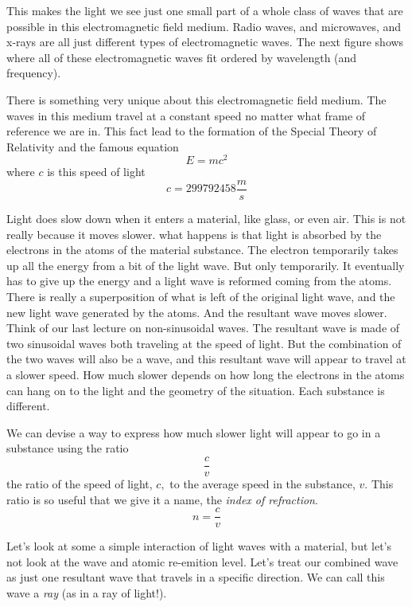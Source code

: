 \documentclass{article}
\begin{document}
This makes the light we see just one small part of a whole class of waves
that are possible in this electromagnetic field medium. Radio waves, and
microwaves, and x-rays are all just different types of electromagnetic
waves. The next figure shows where all of these electromagnetic waves fit
ordered by wavelength (and frequency).

There is something very unique about this electromagnetic field medium. The
waves in this medium travel at a constant speed no matter what frame of
reference we are in. This fact lead to the formation of the Special Theory
of Relativity and the famous equation 
\[
E=mc^{2}
\]%
where $c$ is this speed of light%
\[
c=299792458\frac{\unit{m}}{\unit{s}}
\]

Light does slow down when it enters a material, like glass, or even air.
This is not really because it moves slower. what happens is that light is
absorbed by the electrons in the atoms of the material substance. The
electron temporarily takes up all the energy from a bit of the light wave.
But only temporarily. It eventually has to give up the energy and a light
wave is reformed coming from the atoms. There is really a superposition of
what is left of the original light wave, and the new light wave generated by
the atoms. And the resultant wave moves slower. Think of our last lecture on
non-sinusoidal waves. The resultant wave is made of two sinusoidal waves
both traveling at the speed of light. But the combination of the two waves
will also be a wave, and this resultant wave will appear to travel at a
slower speed. How much slower depends on how long the electrons in the atoms
can hang on to the light and the geometry of the situation. Each substance
is different.

We can devise a way to express how much slower light will appear to go in a
substance using the ratio%
\[
\frac{c}{v}
\]%
the ratio of the speed of light, $c,$ to the average speed in the substance, 
$v.$ This ratio is so useful that we give it a name, the \emph{index of
refraction}.%
\[
n=\frac{c}{v}
\]

Let's look at some a simple interaction of light waves with a material, but
let's not look at the wave and atomic re-emition level. Let's treat our
combined wave as just one resultant wave that travels in a specific
direction. We can call this wave a \emph{ray} (as in a ray of light!).
\end{document}
